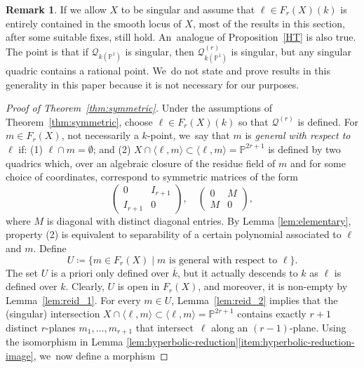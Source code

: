 \documentclass[JEP,XML,SOM,Unicode,NoEqCountersInSection,published]{cedram}
\let\bb\mathbb\let\Bbb\mathbb
\theoremstyle{plain}
\theoremstyle{definition}
\newtheorem{rem}[thm]{Remark}
\newcommand{\defi}[1]{\emph{#1}}
\newcommand{\kbar}{{\overline{k}}}
\renewcommand\P{\mathbb{P}}
\begin{document}
\begin{rem}
If we allow $X$ to be singular and assume that $\ell\in F_r(X)(k)$ is entirely contained in the smooth locus of $X$, most of the results in this section, after some suitable fixes, still hold. An~analogue of Proposition~\ref{HT} is also true. The point is that if $\mathcal{Q}_{k(\P^1)}$ is singular, then $\mathcal{Q}^{(r)}_{k(\P^1)}$ is singular, but any singular quadric contains a rational point. We~do not state and prove results in this generality in this paper because it is not necessary for our purposes.
\end{rem}

\begin{proof}[Proof of Theorem~\ref{thm:symmetric}]
Under the assumptions of Theorem~\ref{thm:symmetric}, choose $\ell\in F_r(X)(k)$ so that $\mathcal{Q}^{(r)}$ is defined.
For $m\in F_r(X)$, not necessarily a $k$\nobreakdash-point, we~say that $m$ is \defi{general with respect to $\ell$} if:
(1) $\ell\cap m=\emptyset$; and (2) $X\cap \langle \ell, m\rangle \subset \langle \ell, m\rangle = \P^{2r+1}$ is defined by two quadrics which, over an algebraic closure of the residue field of $m$ and for some choice of coordinates, correspond to symmetric matrices of the form
\[
\begin{pmatrix}
0 & I_{r+1}\\
I_{r+1} & 0
\end{pmatrix}, \quad
\begin{pmatrix}
0 & M\\
M & 0
\end{pmatrix},
\]
where $M$ is diagonal with distinct diagonal entries.
By Lemma \ref{lem:elementary},
property (2) is equivalent to separability of a certain polynomial associated to $\ell$ and $m$. Define
\[
U\coloneqq\bigl\{m \in F_r(X) \mid m \text{ is general with respect to }\ell \bigl\}.
\]
The set $U$ is a priori only defined over $\kbar$, but it actually descends to $k$ as $\ell$ is defined over $k$.
Clearly, $U$ is open in $F_r(X)$, and moreover, it is non-empty by Lemma~\ref{lem:reid_1}.
For every $m\in U$, Lemma~\ref{lem:reid_2} implies that the (singular) intersection $X\cap \langle \ell, m\rangle \subset \langle \ell,m\rangle = \bb P^{2r+1}$ contains exactly $r+1$ distinct $r$-planes $m_1,\dots, m_{r+1}$ that intersect~$\ell$ along an $(r-1)$-plane.
Using the isomorphism in Lemma \ref{lem:hyperbolic-reduction}\eqref{item:hyperbolic-reduction-image}, we~now define a morphism

\end{proof}
\end{document}
